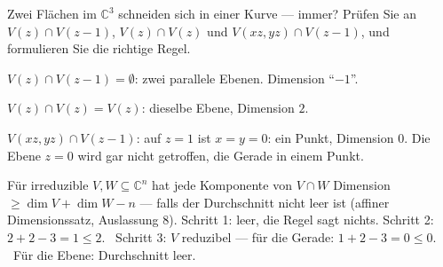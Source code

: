 \begin{aufgabe}
Zwei Flächen im $\mathbb C^{3}$ schneiden sich in einer Kurve --- immer? Prüfen Sie an $V(z)\cap V(z - 1)$, $V(z)\cap V(z)$ und $V(xz, yz)\cap V(z - 1)$, und formulieren Sie die richtige Regel.

\loesung
{}
$V(z)\cap V(z - 1) = \emptyset$: zwei parallele Ebenen. Dimension \enquote{$-1$}.

$V(z)\cap V(z) = V(z)$: dieselbe Ebene, Dimension $2$.

$V(xz, yz)\cap V(z - 1)$: auf $z = 1$ ist $x = y = 0$: ein Punkt, Dimension $0$. Die Ebene $z = 0$ wird gar nicht getroffen, die Gerade in einem Punkt.

Für irreduzible $V, W\subseteq\mathbb C^{n}$ hat jede Komponente von $V\cap W$ Dimension $\ge\dim V + \dim W - n$ --- falls der Durchschnitt nicht leer ist (affiner Dimensionssatz, Auslassung 8). Schritt 1: leer, die Regel sagt nichts. Schritt 2: $2 + 2 - 3 = 1\le2$. \checkmark\ Schritt 3: $V$ reduzibel --- für die Gerade: $1 + 2 - 3 = 0\le0$. \checkmark\ Für die Ebene: Durchschnitt leer.

\begin{center}
\begin{minipage}{0.88\textwidth}
\end{minipage}
\end{center}
\end{aufgabe}

